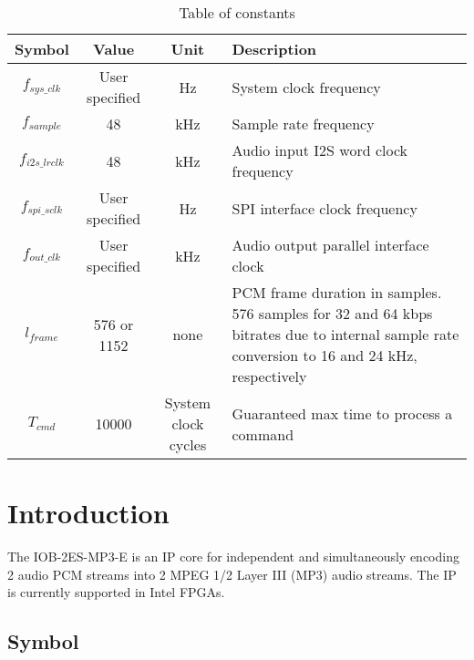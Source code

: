 \documentclass{ug}
\theoremstyle{plain}
\begin{document}
\begin{table}[H]
  \begin{center}
    \begin{tabular}{|c|c|c|p{7cm}|}
      \hline
      \rowcolor{iob-green}
      \textbf{Symbol} & \textbf{Value} & \textbf{Unit} & \textbf{Description} \\
      \hline
      \hline

      $f_{sys\_clk}$ & User specified & Hz & System clock frequency
      \\ \hline

      \rowcolor{iob-blue}
      $f_{sample}$ & 48 & kHz & Sample rate frequency \\
      \hline

      $f_{i2s\_lrclk}$ & 48 & kHz & Audio input I2S word clock
      frequency \\ \hline

      $f_{spi\_sclk}$ & User specified & Hz & SPI interface clock
      frequency\\ \hline

      \rowcolor{iob-blue} $f_{out\_clk}$ & User specified & kHz &
      Audio output parallel interface clock\\ \hline

      $l_{frame}$ & 576 or 1152 & none & PCM frame duration in
      samples. 576 samples for 32 and 64 kbps bitrates due to internal
      sample rate conversion to 16 and 24 kHz, respectively \\ \hline

      \rowcolor{iob-blue} $T_{cmd}$ & 10000 & System clock cycles &
      Guaranteed max time to process a command \\ \hline

    \end{tabular}
    \caption{Table of constants}
    \label{tab:consts}
  \end{center}
\end{table}

\clearpage

\section{Introduction}

The IOB-2ES-MP3-E is an IP core for independent and simultaneously encoding 2
audio PCM streams into 2 MPEG 1/2 Layer III (MP3) audio streams. The IP is
currently supported in Intel FPGAs.


\subsection{Symbol}
\end{document}
